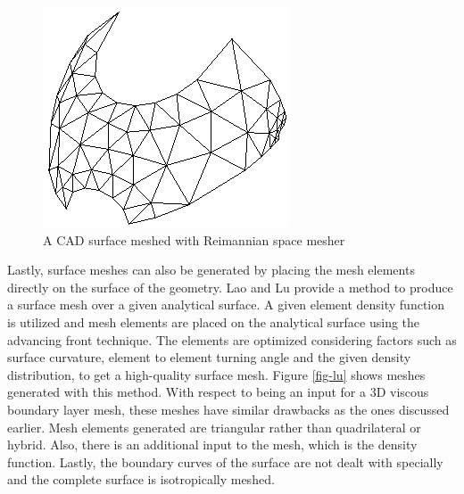 \begin{figure}
	\centering
	\begin{minipage}{0.45\linewidth}
		\centering
		\includegraphics[width=\linewidth]{img/intro/lit/joseph.png}
		\caption{A CAD surface meshed with Reimannian space mesher}
		\label{fig-joseph}
	\end{minipage}
\end{figure}


Lastly, surface meshes can also be generated by placing the mesh elements directly on the surface of the geometry. Lao and Lu \cite{lan1996finite} provide a method to produce a surface mesh over a given analytical surface. A given element density function is utilized and mesh elements are placed on the analytical surface using the advancing front technique. The elements are optimized considering factors such as surface curvature, element to element turning angle and the given density distribution, to get a high-quality surface mesh. Figure \ref{fig-lu} shows meshes generated with this method. With respect to being an input for a 3D viscous boundary layer mesh, these meshes have similar drawbacks as the ones discussed earlier. Mesh elements generated are triangular rather than quadrilateral or hybrid. Also, there is an additional input to the mesh, which is the density function. Lastly, the boundary curves of the surface are not dealt with specially and the complete surface is isotropically meshed.

